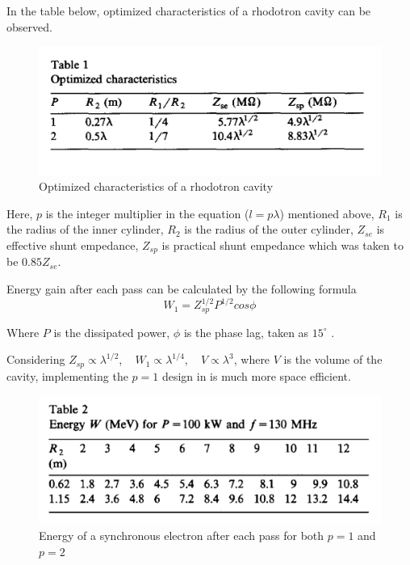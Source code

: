 \documentclass[a4paper,oneside,12pt]{report}
\numberwithin{equation}{chapter}
\begin{document}
In the table below, optimized characteristics of a rhodotron cavity can be observed. 
\begin{figure}[H]
    \centering
    \includegraphics[width=.9\textwidth]{./figures/pottier_table1.png}
    \caption{Optimized characteristics of a rhodotron cavity \cite{rhodo_pottier}}
    \label{fig:pottier_table1}
\end{figure}

Here, $p$ is the integer multiplier in the equation ($l=p\lambda$) mentioned above, $R_1$ is the radius of the inner cylinder, $R_2$ is the radius of the outer cylinder, 
$Z_{se}$ is effective shunt empedance, $Z_{sp}$ is practical shunt empedance which was taken to be $0.85 Z_{se}$.

Energy gain after each pass can be calculated by the following formula \cite{rhodo_pottier}
\begin{equation}
    \label{eq:W_gain_each_pass_pottier}
    W_1 = Z_{sp}^{1/2} P^{1/2} cos \phi  
\end{equation}

Where $P$ is the dissipated power, $\phi$ is the phase lag, taken as $15^\circ$ \cite{rhodo_pottier}. 

Considering $Z_{sp} \propto \lambda^{1/2}$, \,\,\, $W_1 \propto \lambda^{1/4}$, \,\,\,   $V \propto \lambda^3$, where $V$ is the volume of the cavity, implementing the $p=1$ design in  is much more space efficient.
\begin{figure}[H]
    \centering
    \includegraphics[width=.9\textwidth]{./figures/pottier_table2.png}
    \caption{Energy of a synchronous electron after each pass for both $p=1$ and $p=2$ \cite{rhodo_pottier}}
    \label{fig:pottier_table2}
\end{figure}
\end{document}
